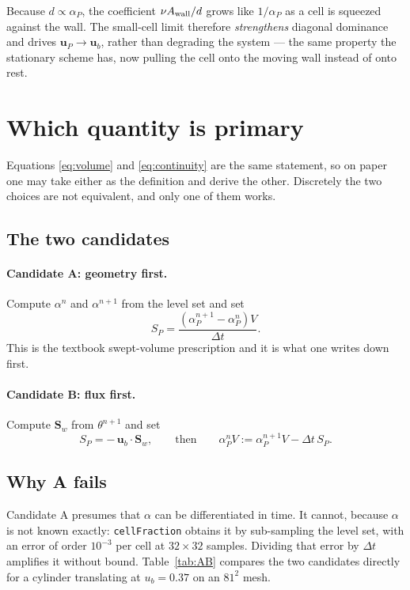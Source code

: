 \documentclass[11pt,a4paper]{article}
\theoremstyle{remark}
\newcommand{\uu}{\bm{u}}
\newcommand{\Sw}{\bm{S}_w}
\newcommand{\ub}{\uu_b}
\newcommand{\dt}{\Delta t}
\begin{document}
Because $d\propto\alpha_P$, the coefficient $\nu A_{\rm wall}/d$ grows like $1/\alpha_P$ as a
cell is squeezed against the wall. The small-cell limit therefore \emph{strengthens} diagonal
dominance and drives $\uu_P\to\ub$, rather than degrading the system --- the same property the
stationary scheme has, now pulling the cell onto the moving wall instead of onto rest.

\section{Which quantity is primary}
\label{sec:primary}

Equations \eqref{eq:volume} and \eqref{eq:continuity} are the same statement, so on paper one may
take either as the definition and derive the other. Discretely the two choices are not
equivalent, and only one of them works.

\subsection{The two candidates}

\paragraph{Candidate A: geometry first.} Compute $\alpha^{n}$ and $\alpha^{n+1}$ from the level
set and set
\begin{equation}
S_P = \frac{(\alpha^{n+1}_P-\alpha^{n}_P)V}{\dt}.
\label{eq:candA}
\end{equation}
This is the textbook swept-volume prescription and it is what one writes down first.

\paragraph{Candidate B: flux first.} Compute $\Sw$ from $\theta^{n+1}$ and set
\begin{equation}
S_P = -\,\ub\!\cdot\!\Sw,
\qquad\text{then}\qquad
\alpha^{n}_P V := \alpha^{n+1}_P V-\dt\,S_P .
\label{eq:candB}
\end{equation}

\subsection{Why A fails}

Candidate A presumes that $\alpha$ can be differentiated in time. It cannot, because $\alpha$ is
not known exactly: \texttt{cellFraction} obtains it by sub-sampling the level set, with an error
of order $10^{-3}$ per cell at $32\times32$ samples. Dividing that error by $\dt$ amplifies it
without bound. Table~\ref{tab:AB} compares the two candidates directly for a cylinder translating
at $u_b=0.37$ on an $81^2$ mesh.
\end{document}
